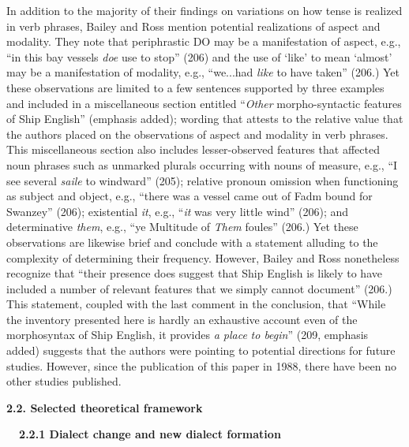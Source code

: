 \begin{styleStandard}
In addition to the majority of their findings on variations on how tense is realized in verb phrases, Bailey and Ross mention potential realizations of aspect and modality. They note that periphrastic DO may be a manifestation of aspect, e.g., “in this bay vessels \textit{doe} use to stop” (206) and the use of ‘like’ to mean ‘almost’ may be a manifestation of modality, e.g., “we...had \textit{like} to have taken” (206.) Yet these observations are limited to a few sentences supported by three examples and included in a miscellaneous section entitled “\textit{Other }morpho-syntactic features of Ship English” (emphasis added); wording that attests to the relative value that the authors placed on the observations of aspect and modality in verb phrases. This miscellaneous section also includes lesser-observed features that affected noun phrases such as unmarked plurals occurring with nouns of measure, e.g., “I see several \textit{saile} to windward” (205); relative pronoun omission when functioning as subject and object, e.g., “there was a vessel came out of Fadm bound for Swanzey” (206); existential \textit{it}, e.g., “\textit{it} was very little wind” (206); and determinative \textit{them}, e.g., “ye Multitude of \textit{Them} foules” (206.) Yet these observations are likewise brief and conclude with a statement alluding to the complexity of determining their frequency. However, Bailey and Ross nonetheless recognize that “their presence does suggest that Ship English is likely to have included a number of relevant features that we simply cannot document” (206.) This statement, coupled with the last comment in the conclusion, that “While the inventory presented here is hardly an exhaustive account even of the morphosyntax of Ship English, it provides \textit{a place} \textit{to begin}” (209, emphasis added) suggests that the authors were pointing to potential directions for future studies. However, since the publication of this paper in 1988, there have been no other studies published. \ 
\end{styleStandard}

\begin{styleStandard}
\textbf{2.2. Selected theoretical framework}
\end{styleStandard}

\begin{styleStandard}
\textbf{\ \ 2.2.1 Dialect change and new dialect formation }
\end{styleStandard}

